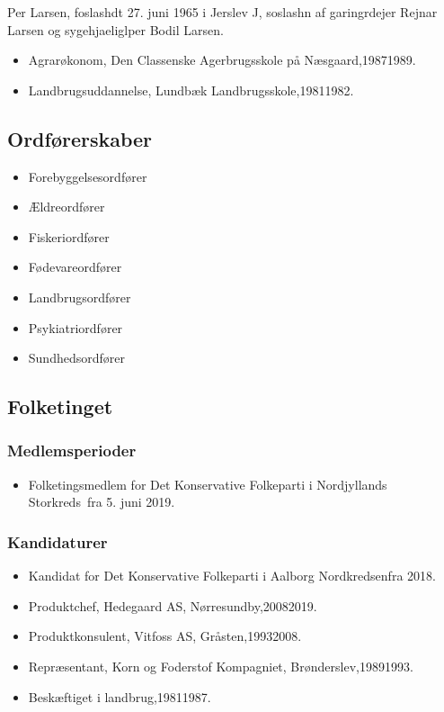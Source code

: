 \documentclass[11pt, a4paper]{awesome-cv}
\begin{document}
\makecvheader[R]
\makelettertitle
\begin{cvletter}
Per Larsen, foslashdt 27. juni 1965 i Jerslev J, soslashn af garingrdejer Rejnar Larsen og sygehjaeliglper Bodil Larsen.

\begin{itemize}
\item Agrarøkonom, Den Classenske Agerbrugsskole på Næsgaard,19871989.
\item Landbrugsuddannelse, Lundbæk Landbrugsskole,19811982.
\end{itemize}
\subsection*{Ordførerskaber}
\begin{itemize}
\item Forebyggelsesordfører
\item Ældreordfører
\item Fiskeriordfører
\item Fødevareordfører
\item Landbrugsordfører
\item Psykiatriordfører
\item Sundhedsordfører
\end{itemize}
\subsection*{Folketinget}
\subsubsection*{Medlemsperioder}
\begin{itemize}
\item Folketingsmedlem for Det Konservative Folkeparti i Nordjyllands Storkreds fra 5. juni 2019.
\end{itemize}
\subsubsection*{Kandidaturer}
\begin{itemize}
\item Kandidat for Det Konservative Folkeparti i Aalborg Nordkredsenfra 2018.
\end{itemize}
\begin{itemize}
\item Produktchef, Hedegaard AS, Nørresundby,20082019.
\item Produktkonsulent, Vitfoss AS, Gråsten,19932008.
\item Repræsentant, Korn og Foderstof Kompagniet, Brønderslev,19891993.
\item Beskæftiget i landbrug,19811987.
\end{itemize}
\end{cvletter}
\end{document}
